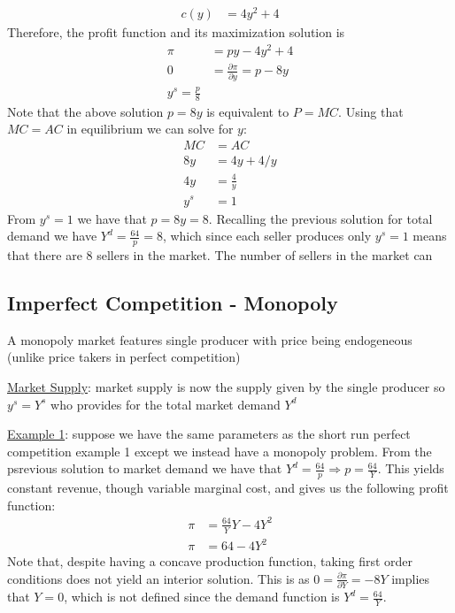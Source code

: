 \documentclass{article}
\begin{document}
\begin{itemize}
\begin{align*}
      c(y) &= 4y^{2} + 4
    \end{align*}
    Therefore, the profit function and its maximization solution is
    \begin{align*}
      \pi &= py - 4y^{2} + 4 \\
      0 &= \frac{\partial \pi}{\partial y} = p - 8y \\
      y^{s} = \frac{p}{8}
    \end{align*}
    Note that the above solution $p = 8y$ is equivalent to $P=MC$. Using that $MC = AC$ in equilibrium we can solve for $y$:
    \begin{align*}
      MC &= AC \\
      8y &= 4y + 4/y \\
      4y &= \frac{4}{y} \\
      y^{s} &= 1
    \end{align*}
    From $y^{s} = 1$ we have that $p = 8y = 8$. Recalling the previous solution for total demand we have $Y^{d} = \frac{64}{p} = 8$, which since each seller produces only $y^{s} = 1$ means that there are 8 sellers in the market. The number of sellers in the market can
  \end{itemize}
  \par
\vspace{6mm}
\subsection{Imperfect Competition - Monopoly}
A monopoly market features single producer with price being endogeneous (unlike price takers in perfect competition) \par \vspace{0.3em}
  \underline{Market Supply}: market supply is now the supply given by the single producer so $y^{s} = Y^{s}$ who provides for the total market demand $Y^{d}$
  \par
  \underline{Example 1}: suppose we have the same parameters as the short run perfect competition example 1 except we instead have a monopoly problem. From the psrevious solution to market demand we have that $Y^{d} = \frac{64}{p} \Rightarrow p = \frac{64}{Y}$. This yields constant revenue, though variable marginal cost, and gives us the following profit function:
  \begin{align*}
    \pi &= \frac{64}{Y}Y - 4Y^{2} \\
    \pi &= 64 - 4Y^{2}
  \end{align*}
  Note that, despite having a concave production function, taking first order conditions does not yield an interior solution. This is as $0 = \tfrac{\partial \pi}{\partial Y} = -8Y$ implies that $Y = 0$, which is not defined since the demand function is $Y^{d} = \tfrac{64}{Y}$.
  \par
\vspace{6mm}
\end{document}
